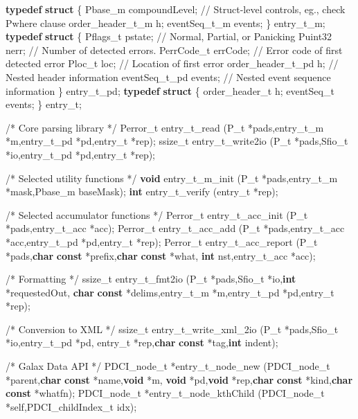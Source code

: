 \documentclass{sigplanconf}
\newcommand{\dibbler}{Sirius}
\newcommand{\bftt}[1]{{\ttfamily\bfseries{#1}}}
\newcommand{\kw}[1]{\bftt{#1}}
\begin{document}
\begin{figure*}
\begin{tiny}
\begin{code}
\kw{typedef} \kw{struct} \{
  Pbase\_m compoundLevel;   // Struct-level controls, eg., check Pwhere clause
  order\_header\_t\_m h;
  eventSeq\_t\_m events;
\} entry\_t\_m;
\mbox{}
\kw{typedef} \kw{struct} \{
  Pflags\_t pstate;         // Normal, Partial, or Panicking 
  Puint32 nerr;            // Number of detected errors.
  PerrCode\_t errCode;      // Error code of first detected error
  Ploc\_t loc;              // Location of first error
  order\_header\_t\_pd h;     // Nested header information
  eventSeq\_t\_pd events;    // Nested event sequence information
\} entry\_t\_pd;
\mbox{}
\kw{typedef} \kw{struct} \{
  order\_header\_t h;
  eventSeq\_t events;
\} entry\_t;
\end{code}
\begin{code}
/* Core parsing library */
Perror\_t entry\_t\_read (P\_t *pads,entry\_t\_m *m,entry\_t\_pd *pd,entry\_t *rep);
ssize\_t entry\_t\_write2io (P\_t *pads,Sfio\_t *io,entry\_t\_pd *pd,entry\_t *rep);
\end{code}
\begin{code}
/* Selected utility functions */
\kw{void} entry\_t\_m\_init (P\_t *pads,entry\_t\_m *mask,Pbase\_m baseMask);
\kw{int} entry\_t\_verify (entry\_t *rep);
\end{code}
\begin{code}
/* Selected accumulator functions */
Perror\_t entry\_t\_acc\_init (P\_t *pads,entry\_t\_acc *acc);
Perror\_t entry\_t\_acc\_add (P\_t *pads,entry\_t\_acc *acc,entry\_t\_pd *pd,entry\_t *rep);
Perror\_t entry\_t\_acc\_report (P\_t *pads,\kw{char} \kw{const} *prefix,\kw{char} \kw{const} *what,
                             \kw{int} nst,entry\_t\_acc *acc);
\end{code}
\begin{code}
/* Formatting */
ssize\_t entry\_t\_fmt2io (P\_t *pads,Sfio\_t *io,\kw{int} *requestedOut,
                        \kw{char} \kw{const} *delims,entry\_t\_m *m,entry\_t\_pd *pd,entry\_t *rep);
\end{code}
\begin{code}
/* Conversion to XML */
ssize\_t entry\_t\_write\_xml\_2io (P\_t *pads,Sfio\_t *io,entry\_t\_pd *pd,
                               entry\_t *rep,\kw{char} \kw{const} *tag,\kw{int} indent);
\end{code}
\begin{code}
/* Galax Data API */
PDCI\_node\_t *entry\_t\_node\_new (PDCI\_node\_t *parent,\kw{char} \kw{const} *name,\kw{void} *m,
                               \kw{void} *pd,\kw{void} *rep,\kw{char} \kw{const} *kind,\kw{char} \kw{const} *whatfn);
PDCI\_node\_t *entry\_t\_node\_kthChild (PDCI\_node\_t *self,PDCI\_childIndex\_t idx);
\end{code}
\caption{Selected portions of the library generated for the \texttt{entry\_t}
  declaration from \dibbler{} data description.}
\label{figure:library}
\end{tiny}
\end{figure*}
\end{document}
